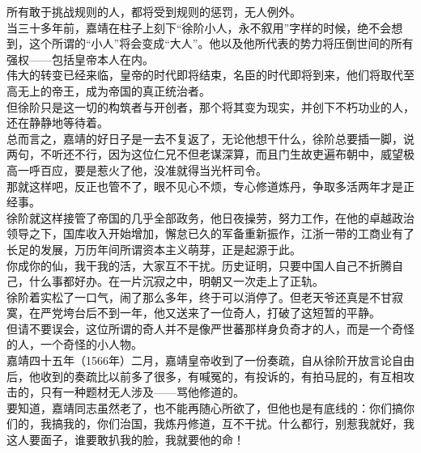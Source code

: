 \begin{multicols}{\theparacolNo}
所有敢于挑战规则的人，都将受到规则的惩罚，无人例外。\\

当三十多年前，嘉靖在柱子上刻下“徐阶小人，永不叙用”字样的时候，绝不会想到，这个所谓的“小人”将会变成“大人”。他以及他所代表的势力将压倒世间的所有强权——包括皇帝本人在内。\\

伟大的转变已经来临，皇帝的时代即将结束，名臣的时代即将到来，他们将取代至高无上的帝王，成为帝国的真正统治者。\\

但徐阶只是这一切的构筑者与开创者，那个将其变为现实，并创下不朽功业的人，还在静静地等待着。\\

总而言之，嘉靖的好日子是一去不复返了，无论他想干什么，徐阶总要插一脚，说两句，不听还不行，因为这位仁兄不但老谋深算，而且门生故吏遍布朝中，威望极高一呼百应，要是惹火了他，没准就得当光杆司令。\\

那就这样吧，反正也管不了，眼不见心不烦，专心修道炼丹，争取多活两年才是正经事。\\

徐阶就这样接管了帝国的几乎全部政务，他日夜操劳，努力工作，在他的卓越政治领导之下，国库收入开始增加，懈怠已久的军备重新振作，江浙一带的工商业有了长足的发展，万历年间所谓资本主义萌芽，正是起源于此。\\

你成你的仙，我干我的活，大家互不干扰。历史证明，只要中国人自己不折腾自己，什么事都好办。在一片沉寂之中，明朝又一次走上了正轨。\\

徐阶着实松了一口气，闹了那么多年，终于可以消停了。但老天爷还真是不甘寂寞，在严党垮台后不到一年，他又送来了一位奇人，打破了这短暂的平静。\\

但请不要误会，这位所谓的奇人并不是像严世蕃那样身负奇才的人，而是一个奇怪的人，一个奇怪的小人物。\\

嘉靖四十五年（1566年）二月，嘉靖皇帝收到了一份奏疏，自从徐阶开放言论自由后，他收到的奏疏比以前多了很多，有喊冤的，有投诉的，有拍马屁的，有互相攻击的，只有一种题材无人涉及——骂他修道的。\\

要知道，嘉靖同志虽然老了，也不能再随心所欲了，但他也是有底线的：你们搞你们的，我搞我的，你们治国，我炼丹修道，互不干扰。什么都行，别惹我就好，我这人要面子，谁要敢扒我的脸，我就要他的命！\\


\end{multicols}
